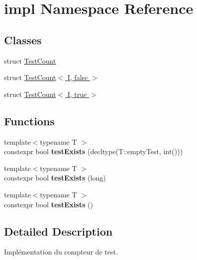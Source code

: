 \hypertarget{namespaceimpl}{}\section{impl Namespace Reference}
\label{namespaceimpl}
\subsection*{Classes}
\begin{DoxyCompactItemize}
\item 
struct \hyperlink{structimpl_1_1TestCount}{Test\+Count}
\item 
struct \hyperlink{structimpl_1_1TestCount_3_01I_00_01false_01_4}{Test\+Count$<$ I, false $>$}
\item 
struct \hyperlink{structimpl_1_1TestCount_3_01I_00_01true_01_4}{Test\+Count$<$ I, true $>$}
\end{DoxyCompactItemize}
\subsection*{Functions}
\begin{DoxyCompactItemize}
\item 
\mbox{\label{namespaceimpl_a7906d56174d1e06fb4a702e0b10905d3}} 
{\footnotesize template$<$typename T $>$ }\\constexpr bool {\bfseries test\+Exists} (decltype(T\+::empty\+Test, int()))
\item 
\mbox{\label{namespaceimpl_a7bdf37b41f6d1d93a26a8077934a4ccd}} 
{\footnotesize template$<$typename T $>$ }\\constexpr bool {\bfseries test\+Exists} (long)
\item 
\mbox{\label{namespaceimpl_afbea0170e33aad3040d0a3e7fbdb3c3d}} 
{\footnotesize template$<$typename T $>$ }\\constexpr bool {\bfseries test\+Exists} ()
\end{DoxyCompactItemize}


\subsection{Detailed Description}
Implémentation du compteur de test. 